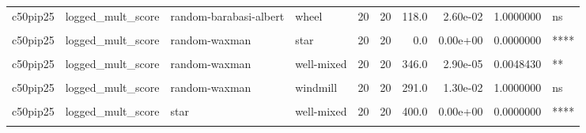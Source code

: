 \documentclass[
]{book}
\begin{document}
\begin{table}
\begin{tabular}{l|l|l|l|r|r|r|r|r|l}
\hline
\cellcolor{gray!6}{c50pip25} & \cellcolor{gray!6}{logged\_mult\_score} & \cellcolor{gray!6}{random-barabasi-albert} & \cellcolor{gray!6}{well-mixed} & \cellcolor{gray!6}{20} & \cellcolor{gray!6}{20} & \cellcolor{gray!6}{345.0} & \cellcolor{gray!6}{3.36e-05} & \cellcolor{gray!6}{0.0055104} & \cellcolor{gray!6}{**}\\
\hline
c50pip25 & logged\_mult\_score & random-barabasi-albert & wheel & 20 & 20 & 118.0 & 2.60e-02 & 1.0000000 & ns\\
\hline
\cellcolor{gray!6}{c50pip25} & \cellcolor{gray!6}{logged\_mult\_score} & \cellcolor{gray!6}{random-barabasi-albert} & \cellcolor{gray!6}{windmill} & \cellcolor{gray!6}{20} & \cellcolor{gray!6}{20} & \cellcolor{gray!6}{300.0} & \cellcolor{gray!6}{6.00e-03} & \cellcolor{gray!6}{0.7380000} & \cellcolor{gray!6}{ns}\\
\hline
c50pip25 & logged\_mult\_score & random-waxman & star & 20 & 20 & 0.0 & 0.00e+00 & 0.0000000 & ****\\
\hline
\cellcolor{gray!6}{c50pip25} & \cellcolor{gray!6}{logged\_mult\_score} & \cellcolor{gray!6}{random-waxman} & \cellcolor{gray!6}{toroidal-lattice} & \cellcolor{gray!6}{20} & \cellcolor{gray!6}{20} & \cellcolor{gray!6}{250.0} & \cellcolor{gray!6}{1.83e-01} & \cellcolor{gray!6}{1.0000000} & \cellcolor{gray!6}{ns}\\
\hline
c50pip25 & logged\_mult\_score & random-waxman & well-mixed & 20 & 20 & 346.0 & 2.90e-05 & 0.0048430 & **\\
\hline
\cellcolor{gray!6}{c50pip25} & \cellcolor{gray!6}{logged\_mult\_score} & \cellcolor{gray!6}{random-waxman} & \cellcolor{gray!6}{wheel} & \cellcolor{gray!6}{20} & \cellcolor{gray!6}{20} & \cellcolor{gray!6}{119.0} & \cellcolor{gray!6}{2.80e-02} & \cellcolor{gray!6}{1.0000000} & \cellcolor{gray!6}{ns}\\
\hline
c50pip25 & logged\_mult\_score & random-waxman & windmill & 20 & 20 & 291.0 & 1.30e-02 & 1.0000000 & ns\\
\hline
\cellcolor{gray!6}{c50pip25} & \cellcolor{gray!6}{logged\_mult\_score} & \cellcolor{gray!6}{star} & \cellcolor{gray!6}{toroidal-lattice} & \cellcolor{gray!6}{20} & \cellcolor{gray!6}{20} & \cellcolor{gray!6}{400.0} & \cellcolor{gray!6}{0.00e+00} & \cellcolor{gray!6}{0.0000000} & \cellcolor{gray!6}{****}\\
\hline
c50pip25 & logged\_mult\_score & star & well-mixed & 20 & 20 & 400.0 & 0.00e+00 & 0.0000000 & ****\\
\hline
\cellcolor{gray!6}{c50pip25} & \cellcolor{gray!6}{logged\_mult\_score} & \cellcolor{gray!6}{star} & \cellcolor{gray!6}{wheel} & \cellcolor{gray!6}{20} & \cellcolor{gray!6}{20} & \cellcolor{gray!6}{400.0} & \cellcolor{gray!6}{0.00e+00} & \cellcolor{gray!6}{0.0000000} & \cellcolor{gray!6}{****}\\

\end{tabular}
\end{table}
\end{document}
